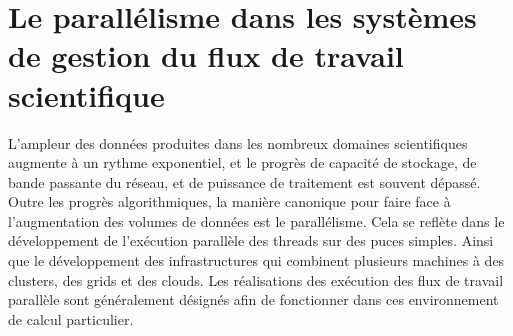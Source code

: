 \vspace{0.5cm}
\section[Le parallélisme]{Le parallélisme dans les systèmes de gestion du flux de travail scientifique}
L'ampleur des données produites dans les nombreux domaines scientifiques augmente à un rythme exponentiel, et le progrès de capacité de stockage, de bande passante du réseau, et de puissance de traitement est souvent dépassé. Outre les progrès algorithmiques, la manière canonique pour faire face à l'augmentation des volumes de données est le parallélisme. Cela se reflète dans le développement de l'exécution parallèle des threads sur des puces simples. Ainsi que le développement des infrastructures qui combinent plusieurs machines à des clusters, des grids et des clouds.
Les réalisations des exécution des flux de travail parallèle sont généralement désignés afin de fonctionner dans ces environnement de calcul particulier.%

